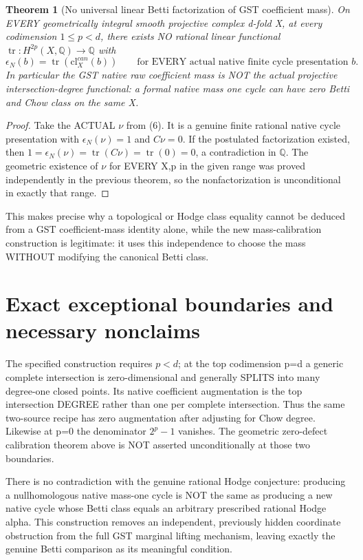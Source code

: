 \documentclass[11pt]{article}
\newtheorem{theorem}{Theorem}
\newcommand{\Q}{\mathbb Q}
\newcommand{\cl}{\mathrm{cl}}
\begin{document}
\begin{theorem}[No universal linear Betti factorization of GST coefficient mass]
On EVERY
geometrically
integral
smooth
projective
complex d-fold X,
at every
codimension
\(1\le p<d\),
there exists
NO rational
linear
functional
\(
 \operatorname{tr}:H^{2p}(X,\Q)\to\Q
\)
with
\[
 \boxed{
 \epsilon_N(b)
   =\operatorname{tr}(\cl_X^{can}(b))
 \qquad\text{for EVERY actual native
 finite cycle presentation }b.
 }                                                        \tag{8}
\]
In particular
the GST
native raw
coefficient mass
is NOT the
actual projective
intersection-degree
functional:
a formal
native mass
one cycle
can have
zero
Betti and
Chow class
on the same
X.
\end{theorem}
\begin{proof}
Take the
ACTUAL
\(\nu\)
from
(6).
It is a
genuine
finite rational
native
cycle
presentation
with
\(\epsilon_N(\nu)=1\)
and
\(C\nu=0\).
If the
postulated
factorization
existed,
then
\(1=\epsilon_N(\nu)
=\operatorname{tr}(C\nu)
=\operatorname{tr}(0)=0\),
a contradiction
in
\(\Q\).
The
geometric
existence of
\(\nu\)
for EVERY
X,p
in the
given
range
was
proved
independently
in the
previous
theorem,
so the
nonfactorization
is
unconditional
in exactly
that range.
\end{proof}

This
makes
precise why
a topological
or Hodge
class
equality
cannot
be
deduced
from
a GST
coefficient-mass
identity
alone,
while the
new
mass-calibration
construction
is
legitimate:
it uses
this
independence
to
choose
the
mass
WITHOUT
modifying
the
canonical
Betti
class.

\section{Exact exceptional boundaries and necessary nonclaims}
The specified construction requires \(p<d\);
at the top codimension p=d a generic complete
intersection is zero-dimensional and generally
SPLITS into many degree-one closed points.
Its native coefficient augmentation is the
top intersection DEGREE rather than one per
complete intersection. Thus the same two-source
recipe has zero augmentation after adjusting
for Chow degree. Likewise at p=0 the denominator
\(2^p-1\) vanishes. The geometric zero-defect
calibration theorem above is NOT asserted
unconditionally at those two boundaries.

There is no contradiction with the genuine
rational Hodge conjecture: producing a
nullhomologous native mass-one cycle is NOT
the same as producing a new native cycle whose
Betti class equals an arbitrary prescribed
rational Hodge alpha. This construction removes
an independent, previously hidden coordinate
obstruction from the full GST marginal lifting
mechanism, leaving exactly the genuine Betti
comparison as its meaningful condition.
\end{document}
